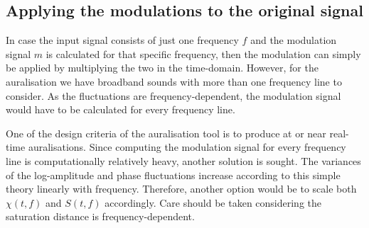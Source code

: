 \subsection{Applying the modulations to the original signal}
In case the input signal consists of just one frequency $f$ and the modulation 
signal $m$ is calculated for that specific frequency, then the modulation can simply be 
applied by multiplying the two in the time-domain.
However, for the auralisation we have broadband sounds with more than one frequency line to consider. 
As the fluctuations are frequency-dependent, the modulation 
signal would have to be calculated for every frequency line.

One of the design criteria of the auralisation tool is to produce at or near 
real-time auralisations. Since computing the modulation signal for every 
frequency line is computationally relatively heavy, another solution is sought.
The variances of the log-amplitude and phase fluctuations increase according to 
this simple theory linearly with frequency. Therefore, another option would be to scale both 
$\chi(t,f)$ and $S(t,f)$ accordingly. Care should be taken considering the saturation distance is frequency-dependent.






